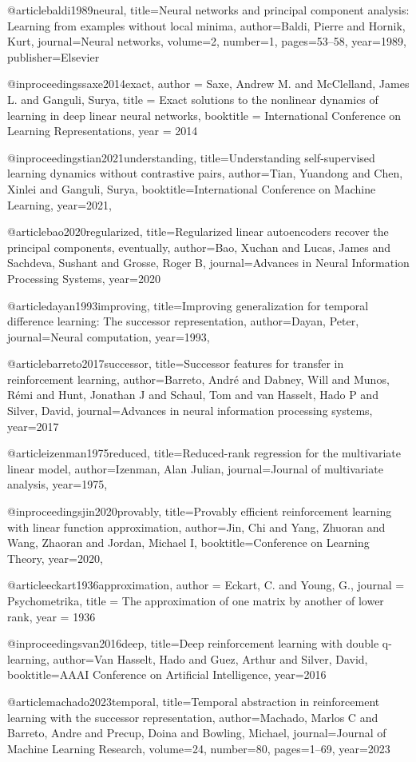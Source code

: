 @article{baldi1989neural,
  title={Neural networks and principal component analysis: Learning from examples without local minima},
  author={Baldi, Pierre and Hornik, Kurt},
  journal={Neural networks},
  volume={2},
  number={1},
  pages={53--58},
  year={1989},
  publisher={Elsevier}
}

@inproceedings{saxe2014exact,
    author = {Saxe, Andrew M. and McClelland, James L. and Ganguli, Surya},
    title = {Exact solutions to the nonlinear dynamics of learning in deep linear neural networks},
    booktitle = {International Conference on Learning Representations},
    year = 2014
}

@inproceedings{tian2021understanding,
  title={Understanding self-supervised learning dynamics without contrastive pairs},
  author={Tian, Yuandong and Chen, Xinlei and Ganguli, Surya},
  booktitle={International Conference on Machine Learning},
  year={2021},
}

@article{bao2020regularized,
  title={Regularized linear autoencoders recover the principal components, eventually},
  author={Bao, Xuchan and Lucas, James and Sachdeva, Sushant and Grosse, Roger B},
  journal={Advances in Neural Information Processing Systems},
  year={2020}
}

@article{dayan1993improving,
  title={Improving generalization for temporal difference learning: The successor representation},
  author={Dayan, Peter},
  journal={Neural computation},
  year={1993},
}

@article{barreto2017successor,
  title={Successor features for transfer in reinforcement learning},
  author={Barreto, Andr{\'e} and Dabney, Will and Munos, R{\'e}mi and Hunt, Jonathan J and Schaul, Tom and van Hasselt, Hado P and Silver, David},
  journal={Advances in neural information processing systems},
  year={2017}
}

@article{izenman1975reduced,
  title={Reduced-rank regression for the multivariate linear model},
  author={Izenman, Alan Julian},
  journal={Journal of multivariate analysis},
  year={1975},
}

@inproceedings{jin2020provably,
  title={Provably efficient reinforcement learning with linear function approximation},
  author={Jin, Chi and Yang, Zhuoran and Wang, Zhaoran and Jordan, Michael I},
  booktitle={Conference on Learning Theory},
  year={2020},
}

@article{eckart1936approximation,
  author = {Eckart, C. and Young, G.},
  journal = {Psychometrika},
  title = {The approximation of one matrix by another of lower rank},
  year = 1936
}

@inproceedings{van2016deep,
  title={Deep reinforcement learning with double q-learning},
  author={Van Hasselt, Hado and Guez, Arthur and Silver, David},
  booktitle={AAAI Conference on Artificial Intelligence},
  year={2016}
}

@article{machado2023temporal,
  title={Temporal abstraction in reinforcement learning with the successor representation},
  author={Machado, Marlos C and Barreto, Andre and Precup, Doina and Bowling, Michael},
  journal={Journal of Machine Learning Research},
  volume={24},
  number={80},
  pages={1--69},
  year={2023}
}

